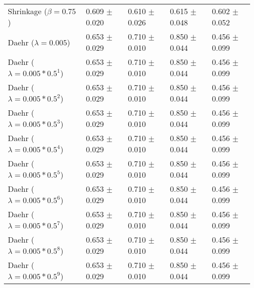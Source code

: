 \begin{table}
\begin{tabular}{*{5}{l}}
Shrinkage ($\beta=0.75$)&0.609 $\pm$ 0.020&0.610 $\pm$ 0.026&0.615 $\pm$ 0.048&0.602 $\pm$ 0.052\\
Daehr ($\lambda=0.005$)&0.653 $\pm$ 0.029&0.710 $\pm$ 0.010&0.850 $\pm$ 0.044&0.456 $\pm$ 0.099\\
Daehr ($\lambda=0.005*0.5^1$)&0.653 $\pm$ 0.029&0.710 $\pm$ 0.010&0.850 $\pm$ 0.044&0.456 $\pm$ 0.099\\
Daehr ($\lambda=0.005*0.5^2$)&0.653 $\pm$ 0.029&0.710 $\pm$ 0.010&0.850 $\pm$ 0.044&0.456 $\pm$ 0.099\\
Daehr ($\lambda=0.005*0.5^3$)&0.653 $\pm$ 0.029&0.710 $\pm$ 0.010&0.850 $\pm$ 0.044&0.456 $\pm$ 0.099\\
Daehr ($\lambda=0.005*0.5^4$)&0.653 $\pm$ 0.029&0.710 $\pm$ 0.010&0.850 $\pm$ 0.044&0.456 $\pm$ 0.099\\
Daehr ($\lambda=0.005*0.5^5$)&0.653 $\pm$ 0.029&0.710 $\pm$ 0.010&0.850 $\pm$ 0.044&0.456 $\pm$ 0.099\\
Daehr ($\lambda=0.005*0.5^6$)&0.653 $\pm$ 0.029&0.710 $\pm$ 0.010&0.850 $\pm$ 0.044&0.456 $\pm$ 0.099\\
Daehr ($\lambda=0.005*0.5^7$)&0.653 $\pm$ 0.029&0.710 $\pm$ 0.010&0.850 $\pm$ 0.044&0.456 $\pm$ 0.099\\
Daehr ($\lambda=0.005*0.5^8$)&0.653 $\pm$ 0.029&0.710 $\pm$ 0.010&0.850 $\pm$ 0.044&0.456 $\pm$ 0.099\\
Daehr ($\lambda=0.005*0.5^9$)&0.653 $\pm$ 0.029&0.710 $\pm$ 0.010&0.850 $\pm$ 0.044&0.456 $\pm$ 0.099\\
\bottomrule
\end{tabular}
\end{table}

